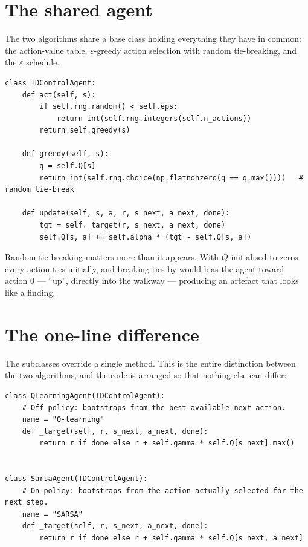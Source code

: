 \section{The shared agent}

The two algorithms share a base class holding everything they have in common: the action-value
table, $\varepsilon$-greedy action selection with random tie-breaking, and the $\varepsilon$
schedule.

{\small
\begin{verbatim}
class TDControlAgent:
    def act(self, s):
        if self.rng.random() < self.eps:
            return int(self.rng.integers(self.n_actions))
        return self.greedy(s)

    def greedy(self, s):
        q = self.Q[s]
        return int(self.rng.choice(np.flatnonzero(q == q.max())))   # random tie-break

    def update(self, s, a, r, s_next, a_next, done):
        tgt = self._target(r, s_next, a_next, done)
        self.Q[s, a] += self.alpha * (tgt - self.Q[s, a])
\end{verbatim}}

Random tie-breaking matters more than it appears. With $Q$ initialised to zeros every action ties
initially, and breaking ties by  would bias the agent toward action $0$ --- ``up'',
directly into the walkway --- producing an artefact that looks like a finding.

\section{The one-line difference}

The subclasses override a single method. This is the entire distinction between the two
algorithms, and the code is arranged so that nothing else can differ:

{\small
\begin{verbatim}
class QLearningAgent(TDControlAgent):
    # Off-policy: bootstraps from the best available next action.
    name = "Q-learning"
    def _target(self, r, s_next, a_next, done):
        return r if done else r + self.gamma * self.Q[s_next].max()


class SarsaAgent(TDControlAgent):
    # On-policy: bootstraps from the action actually selected for the next step.
    name = "SARSA"
    def _target(self, r, s_next, a_next, done):
        return r if done else r + self.gamma * self.Q[s_next, a_next]
\end{verbatim}}

